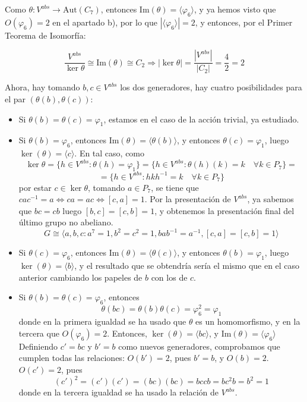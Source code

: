 \documentclass[12pt]{article}
\newcommand{\Aut}{\text{Aut}}
\begin{document}
\begin{ejercicio}
\begin{enumerate}[label=(\alph*)]
\begin{itemize}
\begin{itemize}
                    Como $\theta : V^{abs} \to \Aut(C_7)$, entonces $\text{Im}(\theta) = \langle \varphi_6 \rangle$, y ya hemos visto que $O(\varphi_6) = 2$ en el apartado b), por lo que $|\langle \varphi_6 \rangle| = 2$, y entonces, por el Primer Teorema de Isomorfía:
                    
                    $$\dfrac{V^{abs}}{\ker \theta} \cong \text{Im}(\theta) \cong C_2 \Longrightarrow |\ker \theta| = \dfrac{|V^{abs}|}{|C_2|} = \dfrac{4}{2} = 2$$

                    Ahora, hay tomando $b,c \in V^{abs}$ los dos generadores, hay cuatro posibilidades para el par $(\theta(b), \theta(c))$:

                    \begin{itemize}
                        \item Si $\theta(b) = \theta(c) = \varphi_1$, estamos en el caso de la acción trivial, ya estudiado.
                        \item Si $\theta(b) = \varphi_6$, entonces $\text{Im}(\theta) = \langle \theta(b) \rangle$, y entonces $\theta(c) = \varphi_1$, luego $\ker(\theta) = \langle c \rangle$. En tal caso,
                        como $$\ker \theta = \{h \in V^{abs} : \theta(h) = \varphi_1\} = \{h \in V^{abs} : \theta(h)(k) = k \quad \forall k \in P_7\} = $$$$ = \{h \in V^{abs} : hkh^{-1} = k \quad \forall k \in P_7\}$$
                        por estar $c \in \ker \theta$, tomando $a \in P_7$, se tiene que $cac^{-1} = a \iff ca = ac \iff [c,a] = 1$. Por la presentación de $V^{abs}$, ya sabemos que $bc = cb$ luego $[b,c] = [c,b] = 1$, y obtenemos la presentación final del último grupo no abeliano.
                        $$G \cong \langle a,b,c : a^7=1,b^2 = c^2=1, bab^{-1} = a^{-1}, [c,a] = [c,b] = 1 \rangle$$
                        \item Si $\theta(c) = \varphi_6$, entonces $\text{Im}(\theta) = \langle \theta(c) \rangle$, y entonces $\theta(b) = \varphi_1$, luego $\ker(\theta) = \langle b \rangle$, y el resultado que se obtendría sería el mismo que en el caso anterior cambiando los papeles de $b$ con los de $c$.
                        \item Si $\theta(b) = \theta(c) = \varphi_6$, entonces 
                        $$\theta(bc) = \theta(b)\theta(c) = \varphi_6^2 = \varphi_1$$
                        donde en la primera igualdad se ha usado que $\theta$ es un homomorfismo, y en la tercera que $O(\varphi_6) = 2$. Entonces, $\ker(\theta) = \langle bc \rangle$, y $\text{Im}(\theta) = \langle \varphi_6 \rangle$ Definiendo $c' = bc$ y $b' = b$ como nuevos generadores,
                        comprobamos que cumplen todas las relaciones: $O(b') = 2$, pues $b' = b$, y $O(b) = 2$. $O(c') = 2$, pues $$(c') ^ 2 = (c')(c') = (bc)(bc) = bccb = bc^2b = b^2 = 1$$ donde en la tercera igualdad se ha usado la relación de $V^{abs}$. \\


\end{itemize}
\end{itemize}
\end{itemize}
\end{enumerate}
\end{ejercicio}
\end{document}
